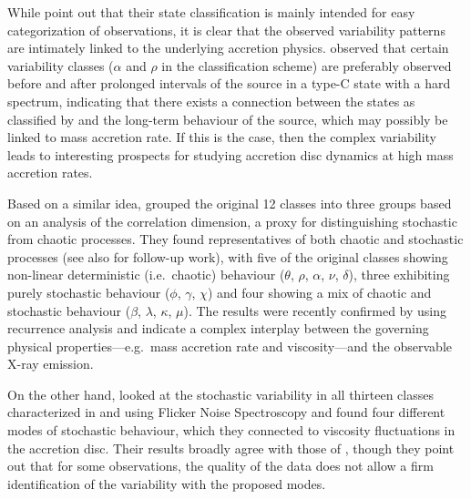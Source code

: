 \documentclass[fleqn,usenatbib]{mnras}
\begin{document}
While \citet{belloni2000} point out that their state classification is mainly intended for easy categorization of observations, it is clear that the observed variability patterns are intimately linked to the underlying accretion physics. \citet{naik2002} observed that certain variability classes ($\alpha$ and $\rho$ in the \citealt{belloni2000} classification scheme) are preferably observed before and after prolonged intervals of the source in a type-C state with a hard spectrum, indicating that there exists a connection between the states as classified by \citet{belloni2000} and the long-term behaviour of the source, which may possibly be linked to mass accretion rate. If this is the case, then the complex variability leads to interesting prospects for studying accretion disc dynamics at high mass accretion rates. 

Based on a similar idea, \citet{misra2004, misra2006} grouped the original 12 classes into three groups based on an analysis of the correlation dimension, a proxy for distinguishing stochastic from chaotic processes. They found representatives of both chaotic and stochastic processes (see also \citealt{harikrishnan2011} for follow-up work), with five of the original classes showing non-linear deterministic (i.e.\ chaotic) behaviour ($\theta$, $\rho$, $\alpha$, $\nu$, $\delta$), three exhibiting purely stochastic behaviour ($\phi$, $\gamma$, $\chi$) and four showing a mix of chaotic and stochastic behaviour ($\beta$, $\lambda$, $\kappa$, $\mu$). The results were recently confirmed by \citet{sukova2016} using recurrence analysis and indicate a complex interplay between the governing physical properties---e.g.\ mass accretion rate and viscosity---and the observable X-ray emission.

On the other hand, \citet{polyakov2012} looked at the stochastic variability in all thirteen classes characterized in \citet{belloni2000} and \citet{kleinwolt2002} using Flicker Noise Spectroscopy and found four different modes of stochastic behaviour, which they connected to viscosity fluctuations in the accretion disc. Their results broadly agree with those of \citet{misra2006}, though they point out that for some observations, the quality of the data does not allow a firm identification of the variability with the proposed modes.
\end{document}

